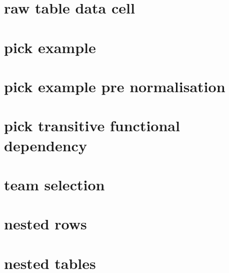 \documentclass[10pt,a4paper]{article}
\begin{document}
\section{raw table data cell}



\section{pick example}


\section{pick example pre normalisation}


\section{pick transitive functional dependency}


\section{team selection}


\section{nested rows}


\section{nested tables}

\end{document}
